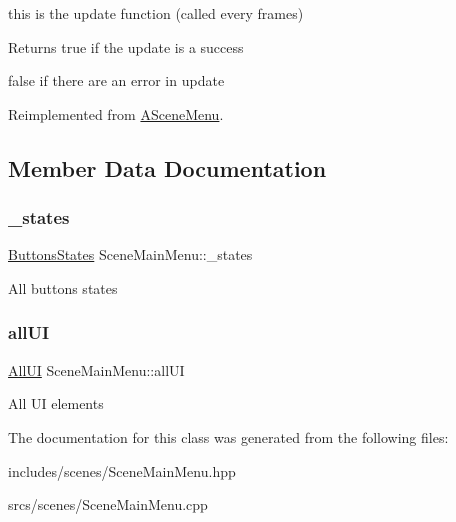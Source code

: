 this is the update function (called every frames) 

\begin{DoxyReturn}{Returns}
true if the update is a success 

false if there are an error in update 
\end{DoxyReturn}


Reimplemented from \hyperlink{class_a_scene_menu_a1deeb5fd9be97376998cd2af36f29744}{A\+Scene\+Menu}.



\subsection{Member Data Documentation}
\mbox{\label{class_scene_main_menu_a1a9956e9fbd9a292485bc48394de910e}} 
\subsubsection{\texorpdfstring{\+\_\+states}{\_states}}
{\footnotesize\ttfamily \hyperlink{struct_scene_main_menu_1_1_buttons_states}{Buttons\+States} Scene\+Main\+Menu\+::\+\_\+states\hspace{0.3cm}{\ttfamily [protected]}}

All buttons states \mbox{\label{class_scene_main_menu_acf61b5346a1e3ea2c7e9d468838973ea}} 
\subsubsection{\texorpdfstring{all\+UI}{allUI}}
{\footnotesize\ttfamily \hyperlink{struct_scene_main_menu_1_1_all_u_i}{All\+UI} Scene\+Main\+Menu\+::all\+UI\hspace{0.3cm}{\ttfamily [protected]}}

All UI elements 

The documentation for this class was generated from the following files\+:\begin{DoxyCompactItemize}
\item 
includes/scenes/Scene\+Main\+Menu.\+hpp\item 
srcs/scenes/Scene\+Main\+Menu.\+cpp\end{DoxyCompactItemize}
